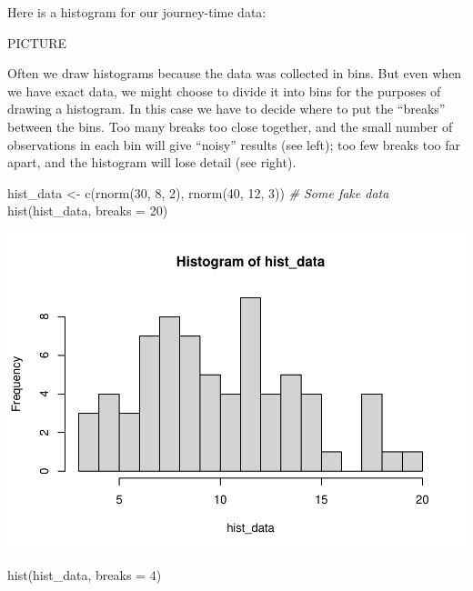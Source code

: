 \documentclass[
  a4paper,
]{book}
\newenvironment{Shaded}{\begin{snugshade}}{\end{snugshade}}
\newcommand{\AttributeTok}[1]{\textcolor[rgb]{0.77,0.63,0.00}{#1}}
\newcommand{\CommentTok}[1]{\textcolor[rgb]{0.56,0.35,0.01}{\textit{#1}}}
\newcommand{\DecValTok}[1]{\textcolor[rgb]{0.00,0.00,0.81}{#1}}
\newcommand{\FunctionTok}[1]{\textcolor[rgb]{0.00,0.00,0.00}{#1}}
\newcommand{\NormalTok}[1]{#1}
\newcommand{\OtherTok}[1]{\textcolor[rgb]{0.56,0.35,0.01}{#1}}
\theoremstyle{definition}
\theoremstyle{definition}
\theoremstyle{definition}
\theoremstyle{remark}
\begin{document}
Here is a histogram for our journey-time data:

PICTURE

Often we draw histograms because the data was collected in bins. But even when we have exact data, we might choose to divide it into bins for the purposes of drawing a histogram. In this case we have to decide where to put the ``breaks'' between the bins. Too many breaks too close together, and the small number of observations in each bin will give ``noisy'' results (see left); too few breaks too far apart, and the histogram will lose detail (see right).

\begin{Shaded}
\begin{Highlighting}[]
\NormalTok{hist\_data }\OtherTok{\textless{}{-}} \FunctionTok{c}\NormalTok{(}\FunctionTok{rnorm}\NormalTok{(}\DecValTok{30}\NormalTok{, }\DecValTok{8}\NormalTok{, }\DecValTok{2}\NormalTok{), }\FunctionTok{rnorm}\NormalTok{(}\DecValTok{40}\NormalTok{, }\DecValTok{12}\NormalTok{, }\DecValTok{3}\NormalTok{))  }\CommentTok{\# Some fake data}
\FunctionTok{hist}\NormalTok{(hist\_data, }\AttributeTok{breaks =} \DecValTok{20}\NormalTok{)}
\end{Highlighting}
\end{Shaded}

\includegraphics{math1710_files/figure-latex/unnamed-chunk-2-1.pdf}

\begin{Shaded}
\begin{Highlighting}[]
\FunctionTok{hist}\NormalTok{(hist\_data, }\AttributeTok{breaks =} \DecValTok{4}\NormalTok{)}
\end{Highlighting}
\end{Shaded}
\end{document}
